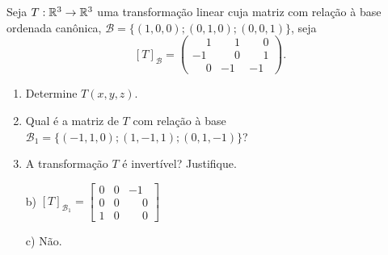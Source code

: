 \documentclass[12pt]{exam}
\begin{document}
\begin{exercicio}
    Seja $T : \mathbb{R}^3 \to \mathbb{R}^3$ uma transformação linear cuja matriz com relação à base ordenada canônica, $\mathcal{B} = \{(1,0,0); (0,1,0); (0,0,1)\}$, seja
    \[
    [T]_\mathcal{B} = \begin{pmatrix}
        \phantom{-}1 & \phantom{-}1 & \phantom{-}0\\
        -1 & \phantom{-}0 & \phantom{-}1\\
        \phantom{-}0 & -1 & -1
    \end{pmatrix}.
    \]
    \begin{enumerate}[label={\alph*})]
        \item Determine $T(x,y,z)$.

        \item Qual é a matriz de $T$ com relação à base $\mathcal{B}_1 = \{(-1,1,0);(1,-1,1);(0,1,-1)\}$?

        \item A transformação $T$ é invertível? Justifique.
    \end{enumerate}
    \begin{solucao}
        \begin{enumerate}
            \item[b)] $[T]_{\mathcal{B}_1} = \begin{bmatrix}
                0 & 0 & -1\\
                0 & 0 & \phantom{-}0\\
                1 & 0 & \phantom{-}0
            \end{bmatrix}$

            \item[c)] Não.
        \end{enumerate}
    \end{solucao}
\end{exercicio}
\end{document}
